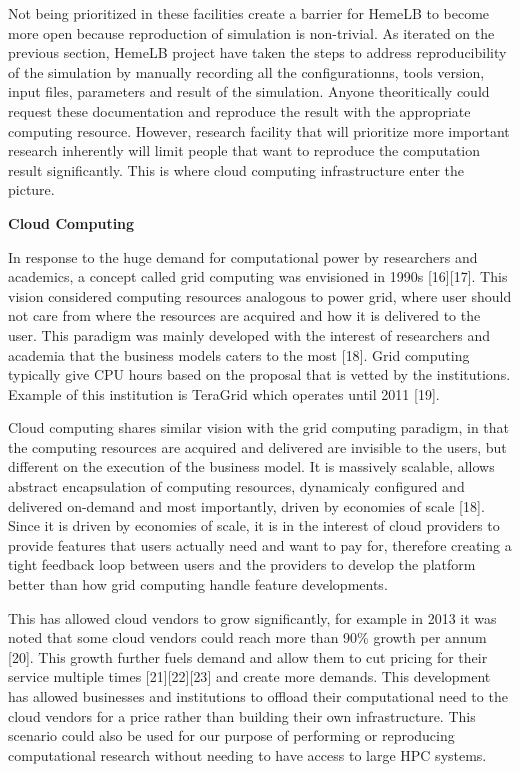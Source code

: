 \documentclass[]{article}
\begin{document}
Not being prioritized in these facilities create a barrier for HemeLB to
become more open because reproduction of simulation is non-trivial. As
iterated on the previous section, HemeLB project have taken the steps to
address reproducibility of the simulation by manually recording all the
configurationns, tools version, input files, parameters and result of
the simulation. Anyone theoritically could request these documentation
and reproduce the result with the appropriate computing resource.
However, research facility that will prioritize more important research
inherently will limit people that want to reproduce the computation
result significantly. This is where cloud computing infrastructure enter
the picture.

\textbf{Cloud Computing}

In response to the huge demand for computational power by researchers
and academics, a concept called grid computing was envisioned in 1990s
{[}16{]}{[}17{]}. This vision considered computing resources analogous
to power grid, where user should not care from where the resources are
acquired and how it is delivered to the user. This paradigm was mainly
developed with the interest of researchers and academia that the
business models caters to the most {[}18{]}. Grid computing typically
give CPU hours based on the proposal that is vetted by the institutions.
Example of this institution is TeraGrid which operates until 2011
{[}19{]}.

Cloud computing shares similar vision with the grid computing paradigm,
in that the computing resources are acquired and delivered are invisible
to the users, but different on the execution of the business model. It
is massively scalable, allows abstract encapsulation of computing
resources, dynamicaly configured and delivered on-demand and most
importantly, driven by economies of scale {[}18{]}. Since it is driven
by economies of scale, it is in the interest of cloud providers to
provide features that users actually need and want to pay for, therefore
creating a tight feedback loop between users and the providers to
develop the platform better than how grid computing handle feature
developments.

This has allowed cloud vendors to grow significantly, for example in
2013 it was noted that some cloud vendors could reach more than 90\%
growth per annum {[}20{]}. This growth further fuels demand and allow
them to cut pricing for their service multiple times
{[}21{]}{[}22{]}{[}23{]} and create more demands. This development has
allowed businesses and institutions to offload their computational need
to the cloud vendors for a price rather than building their own
infrastructure. This scenario could also be used for our purpose of
performing or reproducing computational research without needing to have
access to large HPC systems.
\end{document}
